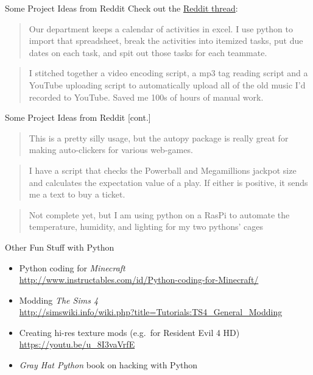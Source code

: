 \documentclass[xcolor={usenames,svgnames,x11names,dvipsnames,table}]{beamer}
\begin{document}
\begin{frame}{Some Project Ideas from Reddit}
    Check out the \href{https://www.reddit.com/r/Python/comments/308ucq/how_do_you_use_python_to_automate_tasks_in_life/}{Reddit thread}:

    \medskip
    \pause
    \begin{quote}
        Our department keeps a calendar of activities in excel.
        I use python to import that spreadsheet, break the activities into itemized tasks, put due dates on each task, and spit out those tasks for each teammate.
    \end{quote}

    \pause
    \begin{quote}
        I stitched together a video encoding script, a mp3 tag reading script and a YouTube uploading script to automatically upload all of the old music I'd recorded to YouTube. Saved me 100s of hours of manual work. 
    \end{quote}
\end{frame}

\begin{frame}{Some Project Ideas from Reddit [cont.]}
    \begin{quote}
        This is a pretty silly usage, but the autopy package is really great for making auto-clickers for various web-games. 
    \end{quote}

    \begin{quote}
        I have a script that checks the Powerball and Megamillions jackpot size and calculates the expectation value of a play. If either is positive, it sends me a text to buy a ticket.
    \end{quote}

    \begin{quote}
        Not complete yet, but I am using python on a RasPi to automate the temperature, humidity, and lighting for my two pythons' cages
    \end{quote}
\end{frame}


\begin{frame}{Other Fun Stuff with Python}
    \begin{itemize}
        \item Python coding for \emph{Minecraft}\\
            \href{http://www.instructables.com/id/Python-coding-for-Minecraft/}{http://www.instructables.com/id/Python-coding-for-Minecraft/}
        \item Modding \emph{The Sims 4}\\
            \href{http://simswiki.info/wiki.php?title=Tutorials:TS4_General_Modding}{http://simswiki.info/wiki.php?title=Tutorials:TS4\_General\_Modding}
        \item Creating hi-res texture mods (e.g.\ for Resident Evil 4 HD)\\
            \href{https://youtu.be/u_8I3vaVrfE}{https://youtu.be/u\_8I3vaVrfE}
        \item \emph{Gray Hat Python} book on hacking with Python
    \end{itemize}
\end{frame}
\end{document}
